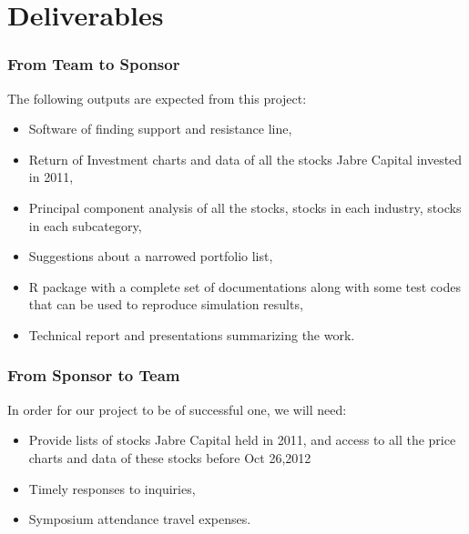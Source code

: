 \documentclass[compress,handout,10pt]{beamer}
\let\olditem\item
\renewcommand{\item}{\setlength{\itemsep}{0.5\baselineskip}\olditem}
\begin{document}
\section{Deliverables}
\begin{frame}
    \frametitle{From Team to Sponsor}
The following outputs are expected from this project:
\begin{itemize}
    \item Software of finding support and resistance line,
    \item Return of Investment charts and data of all the stocks Jabre Capital invested in 2011,
    \item Principal component analysis of all the stocks, stocks in each industry, stocks in each subcategory,
    \item Suggestions about a narrowed portfolio list,
    \item R package with a complete set of documentations along with some test codes that can be used to reproduce simulation results,
    \item Technical report and presentations summarizing the work. 
\end{itemize}

\end{frame}

\begin{frame}
    \frametitle{From Sponsor to Team}
In order for our project to be of successful one, we will need:
\begin{itemize}
    \item Provide lists of stocks Jabre Capital held in 2011, and access to all the price charts and data of these stocks before Oct 26,2012
     \item Timely responses to inquiries, 
    \item Symposium attendance travel expenses.
\end{itemize}


\end{frame}
\end{document}

